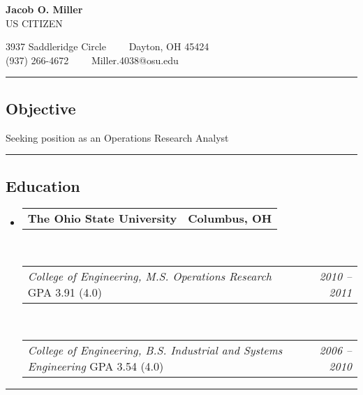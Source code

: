 \documentclass[10pt,letterpaper]{article}
\makeatletter
\newenvironment{indentsection}[1]%
{\begin{list}{}%
	{\setlength{\leftmargin}{#1}}%
	\item[]%
}
{\end{list}}
\newcommand{\headerrow}[2]
{\begin{tabular*}{\linewidth}{l@{\extracolsep{\fill}}r}
	#1 &
	#2 \\
\end{tabular*}}
\makeatother
\begin{document}
\thispagestyle{empty}

\begin{center}
{\LARGE \textbf{Jacob O. Miller}}\\
{\large US CITIZEN}

3937 Saddleridge Circle\ \ \textbullet
\ \ Dayton, OH 45424
\\
(937) 266-4672\ \ \textbullet
\ \ Miller.4038@osu.edu
\end{center}
\hrule
\vspace{-0.4em}

\subsection*{Objective}

\begin{indentsection}{\parindent}
Seeking position as an Operations Research Analyst
\end{indentsection}

\hrule
\vspace{-0.4em}
\subsection*{Education}
\begin{itemize}
	\parskip=0.1em
	\item 
	\headerrow
		{\textbf{The Ohio State University}}
		{\textbf{Columbus, OH}}
	\\
	\headerrow
		{\emph{College of Engineering, M.S. Operations Research} \hspace{7em} GPA 3.91 (4.0)}
		{\emph{2010 -- 2011}}
	\\
	\headerrow
		{\emph{College of Engineering, B.S. Industrial and Systems Engineering} \hspace{1em} GPA 3.54 (4.0)}
		{\emph{2006 -- 2010}}
\end{itemize}
\hrule
\vspace{-0.4em}
\end{document}
